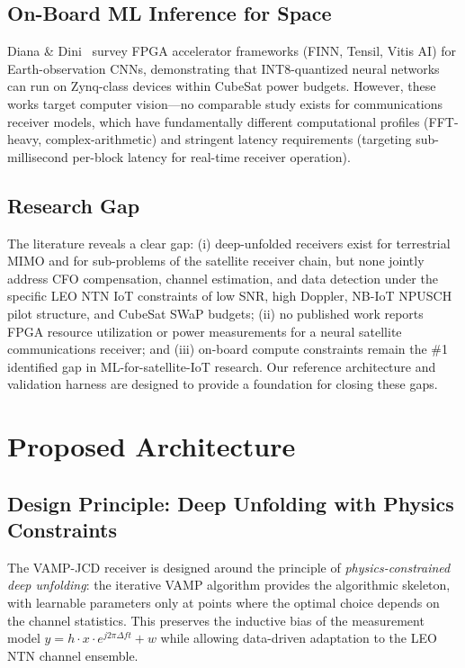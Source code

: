 \documentclass{article}
\begin{document}
\subsection{On-Board ML Inference for Space}

Diana \& Dini~\cite{diana2024onboard} survey FPGA accelerator frameworks (FINN, Tensil, Vitis AI) for Earth-observation CNNs, demonstrating that INT8-quantized neural networks can run on Zynq-class devices within CubeSat power budgets. However, these works target computer vision---no comparable study exists for communications receiver models, which have fundamentally different computational profiles (FFT-heavy, complex-arithmetic) and stringent latency requirements (targeting sub-millisecond per-block latency for real-time receiver operation).

\subsection{Research Gap}

The literature reveals a clear gap: (i) deep-unfolded receivers exist for terrestrial MIMO and for sub-problems of the satellite receiver chain, but none jointly address CFO compensation, channel estimation, and data detection under the specific LEO NTN IoT constraints of low SNR, high Doppler, NB-IoT NPUSCH pilot structure, and CubeSat SWaP budgets; (ii) no published work reports FPGA resource utilization or power measurements for a neural satellite communications receiver; and (iii) on-board compute constraints remain the \#1 identified gap in ML-for-satellite-IoT research. Our reference architecture and validation harness are designed to provide a foundation for closing these gaps.

\section{Proposed Architecture}
\label{sec:method}

\subsection{Design Principle: Deep Unfolding with Physics Constraints}

The VAMP-JCD receiver is designed around the principle of \emph{physics-constrained deep unfolding}: the iterative VAMP algorithm provides the algorithmic skeleton, with learnable parameters only at points where the optimal choice depends on the channel statistics. This preserves the inductive bias of the measurement model $y = h \cdot x \cdot e^{j2\pi\Delta f t} + w$ while allowing data-driven adaptation to the LEO NTN channel ensemble.
\end{document}
